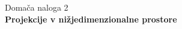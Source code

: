 \documentclass[11pt,a4paper]{article}
\begin{document}
\huge Domača naloga 2 \\
\Huge \textbf{Projekcije v nižjedimenzionalne prostore}


\end{document}
